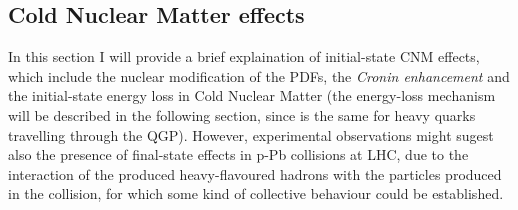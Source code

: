\documentclass[b5paper,10pt,twoside,oldstyle,classica]{toptesi}
\begin{document}
\subsection{Cold Nuclear Matter effects}
\label{CNM_sec}
In this section I will provide a brief explaination of initial-state CNM effects, which include the nuclear modification of the PDFs, the \textit{Cronin enhancement} and the initial-state energy loss in Cold Nuclear Matter (the energy-loss mechanism will be described in the following section, since is the same for heavy quarks travelling through the QGP). However, experimental observations might sugest also the presence of final-state effects in p-Pb collisions at LHC, due to the interaction of the produced heavy-flavoured hadrons with the particles produced in the collision, for which some kind of collective behaviour could be established.  
\end{document}
